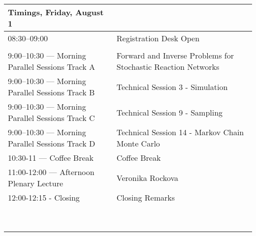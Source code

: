 \begin{sideways}
\begin{tabular}{l|l}
\hline
\large\textbf{Timings, Friday,
 August 1} & \large\textbf{} \\
\hline
\cellcolor{\EmptyColor}08:30–09:00 & \cellcolor{\EmptyColor}Registration Desk Open \\
\cellcolor{\SessionTitleColor} & \cellcolor{\SessionTitleColor} \\
\cellcolor{\SessionTitleColor}9:00–10:30 — Morning Parallel Sessions Track A & \cellcolor{\SessionTitleColor}Forward and Inverse Problems for Stochastic Reaction Networks \\
\cellcolor{\SessionLightColor}9:00–10:30 — Morning Parallel Sessions Track B & \cellcolor{\SessionLightColor}Technical Session 3 - Simulation \\
\cellcolor{\SessionLightColor}9:00–10:30 — Morning Parallel Sessions Track C & \cellcolor{\SessionLightColor}Technical Session 9 - Sampling \\
\cellcolor{\SessionLightColor}9:00–10:30 — Morning Parallel Sessions Track D & \cellcolor{\SessionLightColor}Technical Session 14 - Markov Chain Monte Carlo \\
\cellcolor{\EmptyColor}10:30-11 — Coffee Break & \cellcolor{\EmptyColor}Coffee Break \\
\cellcolor{\PlenaryColor}11:00-12:00 — Afternoon Plenary Lecture & \cellcolor{\PlenaryColor}Veronika Rockova \\
\cellcolor{\SessionTitleColor}12:00-12:15 - Closing & \cellcolor{\SessionTitleColor}Closing Remarks \\
\cellcolor{\SessionTitleColor} & \cellcolor{\SessionTitleColor} \\
\cellcolor{\SessionTitleColor} & \cellcolor{\SessionTitleColor} \\
\cellcolor{\SessionTitleColor} & \cellcolor{\SessionTitleColor} \\
\cellcolor{\SessionTitleColor} & \cellcolor{\SessionTitleColor} \\
\cellcolor{\SessionTitleColor} & \cellcolor{\SessionTitleColor} \\
\cellcolor{\SessionTitleColor} & \cellcolor{\SessionTitleColor} \\
\cellcolor{\SessionTitleColor} & \cellcolor{\SessionTitleColor} \\
\cellcolor{\SessionTitleColor} & \cellcolor{\SessionTitleColor} \\
\cellcolor{\SessionTitleColor} & \cellcolor{\SessionTitleColor} \\
\hline
\end{tabular}
\end{sideways}

